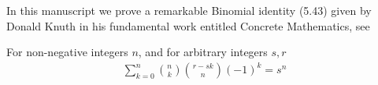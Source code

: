 In this manuscript we prove a remarkable
Binomial identity (5.43) given by Donald Knuth in
his fundamental work entitled
Concrete Mathematics, see~\cite[p. 190]{graham1994concrete}
\begin{proposition}
  \label{prop:knuth-identity}
  For non-negative integers $n$, and for arbitrary integers $s, r$
  \begin{align*}
    \sum_{k=0}^{n} \binom{n}{k} \binom{r-sk}{n} (-1)^k = s^n
  \end{align*}
\end{proposition}
